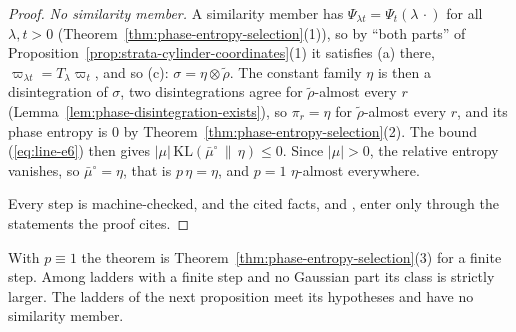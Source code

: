 \begin{proof}
\emph{No similarity member.} A similarity member has $\Psi_{\lambda t} = \Psi_t(\lambda\,\cdot)$
for all $\lambda, t > 0$ (Theorem~\ref{thm:phase-entropy-selection}(1)), so by ``both parts'' of
Proposition~\ref{prop:strata-cylinder-coordinates}(1) it satisfies (a) there,
$\varpi_{\lambda t} = T_\lambda\varpi_t$, and so (c): $\sigma = \eta \otimes \tilde\rho$. The
constant family $\eta$ is then a disintegration of $\sigma$, two disintegrations agree for
$\tilde\rho$-almost every $r$ (Lemma~\ref{lem:phase-disintegration-exists}), so $\pi_r = \eta$ for
$\tilde\rho$-almost every $r$, and its phase entropy is $0$ by
Theorem~\ref{thm:phase-entropy-selection}(2). The bound (\ref{eq:line-e6}) then gives
$|\mu|\,\mathrm{KL}(\bar\mu^\circ \,\|\, \eta) \le 0$. Since $|\mu| > 0$, the relative entropy
vanishes, so $\bar\mu^\circ = \eta$, that is $p\,\eta = \eta$, and $p = 1$ $\eta$-almost
everywhere.

Every step is machine-checked, and the cited facts,  and , enter only
through the statements the proof cites.
\end{proof}

With $p \equiv 1$ the theorem is Theorem~\ref{thm:phase-entropy-selection}(3) for a finite step.
Among ladders with a finite step and no Gaussian part its class is strictly larger. The ladders of
the next proposition meet its hypotheses and have no similarity member.

